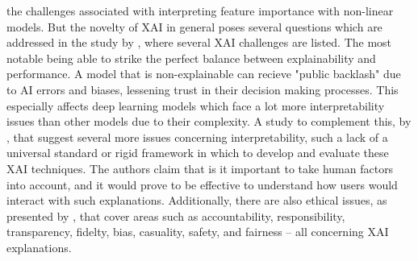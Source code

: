 the challenges associated with interpreting feature importance with non-linear models. But the novelty of XAI in general poses several questions which are addressed in the study by \cite{yakandawala2023review}, where several XAI challenges are listed. The most notable being able to strike the perfect balance between explainability and performance. A model that is non-explainable can recieve "public backlash" due to AI errors and biases, lessening trust in their decision making processes. This especially affects deep learning models which face a lot more interpretability issues than other models due to their complexity. A study to complement this, by \cite{reddy2023explainable}, that suggest several more issues concerning interpretability, such a lack of a universal standard or rigid framework in which to develop and evaluate these XAI techniques. The authors claim that is it important to take human factors into account, and it would prove to be effective to understand how users would interact with such explanations. Additionally, there are also ethical issues, as presented by \cite{hanif2021survey}, that cover areas such as accountability, responsibility, transparency, fidelty, bias, casuality, safety, and fairness -- all concerning XAI explanations.
